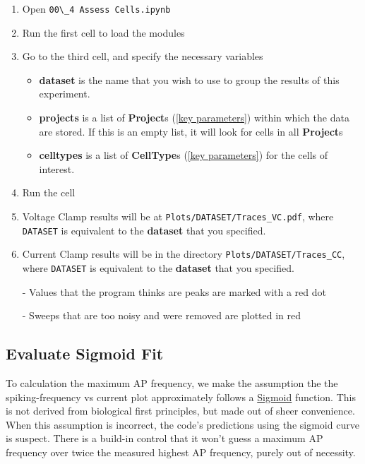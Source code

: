 \documentclass{article}
\begin{document}
\begin{enumerate}
    \item Open \verb|00\_4 Assess Cells.ipynb|
    
    \item Run the first cell to load the modules
    
    \item Go to the third cell, and specify the necessary variables
    
    \begin{itemize}
        \item \textbf{dataset} is the name that you wish to use to group the results of this experiment.
        
        \item \textbf{projects} is a list of \textbf{Project}s (\ref{key parameters}) within which the data are stored. If this is an empty list, it will look for cells in all \textbf{Project}s
        
        \item \textbf{celltypes} is a list of \textbf{CellType}s (\ref{key parameters}) for the cells of interest.
    \end{itemize}
    
    \item Run the cell
    
    \item Voltage Clamp results will be at \verb|Plots/DATASET/Traces_VC.pdf|, where \verb|DATASET| is equivalent to the \textbf{dataset} that you specified.
    
    \item Current Clamp results will be in the directory \verb|Plots/DATASET/Traces_CC|, where \verb|DATASET| is equivalent to the \textbf{dataset} that you specified.
    
    - Values that the program thinks are peaks are marked with a red dot
    
    - Sweeps that are too noisy and were removed are plotted in red
\end{enumerate}


\subsection{Evaluate Sigmoid Fit}

To calculation the maximum AP frequency, we make the assumption the the spiking-frequency vs current plot approximately follows a \href{https://en.wikipedia.org/wiki/Sigmoid\_function}{Sigmoid} function. This is not derived from biological first principles, but made out of sheer convenience. When this assumption is incorrect, the code's predictions using the sigmoid curve is suspect. There is a build-in control that it won't guess a maximum AP frequency over twice the measured highest AP frequency, purely out of necessity.
\end{document}
